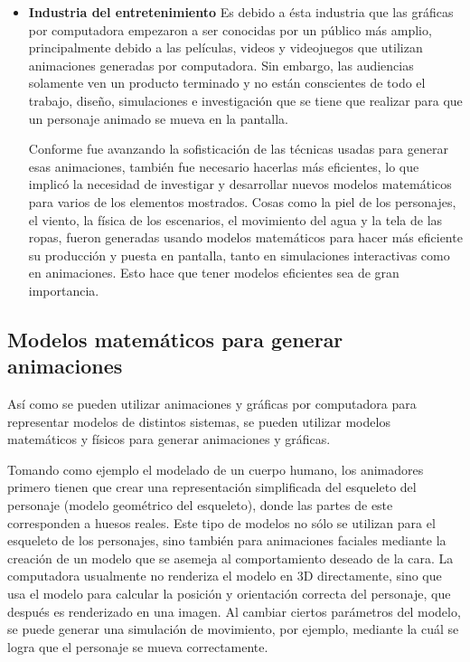 \begin{itemize}
	\item \textbf{Industria del entretenimiento}
Es debido a ésta industria que las gráficas por computadora empezaron a ser conocidas por un público más amplio, principalmente debido a  las películas, videos y videojuegos que utilizan animaciones generadas por computadora. Sin embargo, las audiencias solamente ven un producto terminado y no están conscientes de todo el trabajo, diseño, simulaciones e investigación que se tiene que realizar para que un personaje animado se mueva en la pantalla.

Conforme fue avanzando la sofisticación de las técnicas usadas para generar esas animaciones, también fue necesario hacerlas más eficientes, lo que implicó la necesidad de investigar y desarrollar nuevos modelos matemáticos para varios de los elementos mostrados. Cosas  como la piel de los personajes, el viento, la física de los escenarios, el movimiento del agua y la tela de las ropas, fueron generadas usando modelos matemáticos para hacer más eficiente su producción y puesta en pantalla, tanto en simulaciones interactivas como en animaciones. Esto hace que tener modelos eficientes sea de gran importancia.

\end{itemize}

\subsection{Modelos matemáticos para generar animaciones}

Así como se pueden utilizar animaciones y gráficas por computadora para representar modelos de distintos sistemas, se pueden utilizar modelos matemáticos y físicos para generar animaciones y gráficas.

Tomando como ejemplo el modelado de un cuerpo humano, los animadores primero tienen que crear una representación simplificada del esqueleto del personaje (modelo geométrico del esqueleto), donde las partes de este corresponden a huesos reales. Este tipo de modelos no sólo se utilizan para el esqueleto de los personajes, sino también para animaciones faciales mediante la creación de un modelo que se asemeja al comportamiento deseado de la cara. La computadora usualmente no renderiza el modelo en 3D directamente, sino que usa el modelo para calcular la posición y orientación correcta del personaje, que después es renderizado en una imagen. Al cambiar ciertos parámetros del modelo, se puede generar una simulación de movimiento, por ejemplo, mediante la cuál se logra que el personaje se mueva correctamente.

